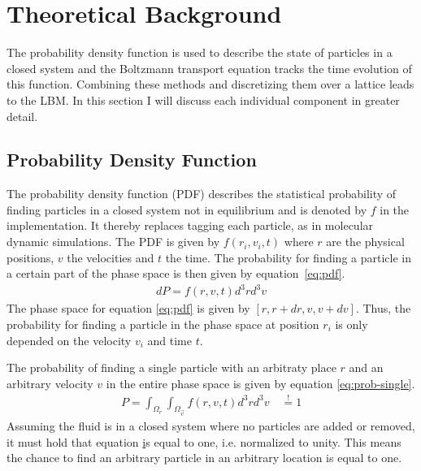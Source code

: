 \documentclass[a4paper,12pt, oneside]{book}
\begin{document}
\chapter{Theoretical Background}
The probability density function is used to describe the state of particles in a closed system and the Boltzmann transport equation tracks the time evolution of this function.
Combining these methods and discretizing them over a lattice leads to the LBM.
In this section I will discuss each individual component in greater detail.

\section{Probability Density Function}
The probability density function (PDF) describes the statistical probability of finding particles in a closed system not in equilibrium and is denoted by $f$ in the implementation.
It thereby replaces tagging each particle, as in molecular dynamic simulations.
The PDF is given by $f(r_i,v_i,t)$ where $r$ are the physical positions, $v$ the velocities and $t$ the time.
The probability for finding a particle in a certain part of the phase space is then given by equation~\ref{eq:pdf}.
\begin{equation}
  \label{eq:pdf}
  \begin{aligned}
    dP = f(r,v,t) d^{3}r d^{3}v
  \end{aligned}
\end{equation}
The phase space for equation \ref{eq:pdf} is given by $[r, r+dr, v, v+dv]$.
Thus, the probability for finding a particle in the phase space at position $r_i$ is only depended on the velocity $v_i$ and time $t$.

The probability of finding a single particle with an arbitraty place $r$ and an arbitrary velocity $v$ in the entire phase space is given by equation \ref{eq:prob-single}.
\begin{equation}
  \label{eq:prob-single}
  \begin{aligned}
    P = \int_{\Omega_{r}} \int_{\Omega_{\vec{v}}}  f(r,v,t) d^{3}r d^{3}v \quad \overset{!}{=} 1
  \end{aligned}
\end{equation}
Assuming the fluid is in a closed system where no particles are added or removed, it must hold that equation \href{eq:prob-single} is equal to one, i.e. normalized to unity. 
This means the chance to find an arbitrary particle in an arbitrary location is equal to one.
\end{document}
